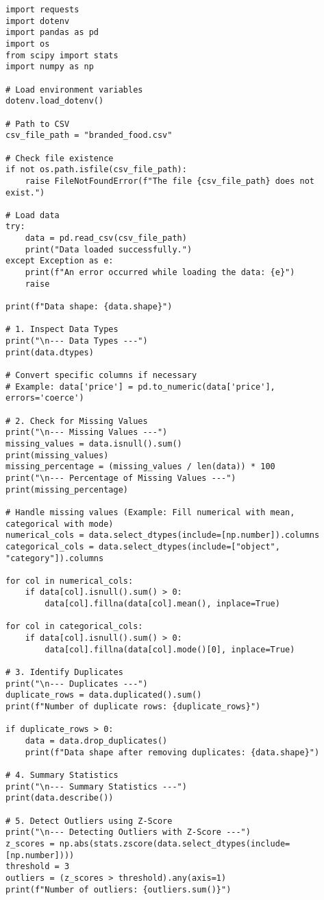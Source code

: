 \begin{lstlisting}[style=pythonStyle, caption={Validate the Data}, label={lst:validate_data}]
import requests
import dotenv
import pandas as pd
import os
from scipy import stats
import numpy as np

# Load environment variables
dotenv.load_dotenv()

# Path to CSV
csv_file_path = "branded_food.csv"

# Check file existence
if not os.path.isfile(csv_file_path):
    raise FileNotFoundError(f"The file {csv_file_path} does not exist.")

# Load data
try:
    data = pd.read_csv(csv_file_path)
    print("Data loaded successfully.")
except Exception as e:
    print(f"An error occurred while loading the data: {e}")
    raise

print(f"Data shape: {data.shape}")

# 1. Inspect Data Types
print("\n--- Data Types ---")
print(data.dtypes)

# Convert specific columns if necessary
# Example: data['price'] = pd.to_numeric(data['price'], errors='coerce')

# 2. Check for Missing Values
print("\n--- Missing Values ---")
missing_values = data.isnull().sum()
print(missing_values)
missing_percentage = (missing_values / len(data)) * 100
print("\n--- Percentage of Missing Values ---")
print(missing_percentage)

# Handle missing values (Example: Fill numerical with mean, categorical with mode)
numerical_cols = data.select_dtypes(include=[np.number]).columns
categorical_cols = data.select_dtypes(include=["object", "category"]).columns

for col in numerical_cols:
    if data[col].isnull().sum() > 0:
        data[col].fillna(data[col].mean(), inplace=True)

for col in categorical_cols:
    if data[col].isnull().sum() > 0:
        data[col].fillna(data[col].mode()[0], inplace=True)

# 3. Identify Duplicates
print("\n--- Duplicates ---")
duplicate_rows = data.duplicated().sum()
print(f"Number of duplicate rows: {duplicate_rows}")

if duplicate_rows > 0:
    data = data.drop_duplicates()
    print(f"Data shape after removing duplicates: {data.shape}")

# 4. Summary Statistics
print("\n--- Summary Statistics ---")
print(data.describe())

# 5. Detect Outliers using Z-Score
print("\n--- Detecting Outliers with Z-Score ---")
z_scores = np.abs(stats.zscore(data.select_dtypes(include=[np.number])))
threshold = 3
outliers = (z_scores > threshold).any(axis=1)
print(f"Number of outliers: {outliers.sum()}")


\end{lstlisting}
